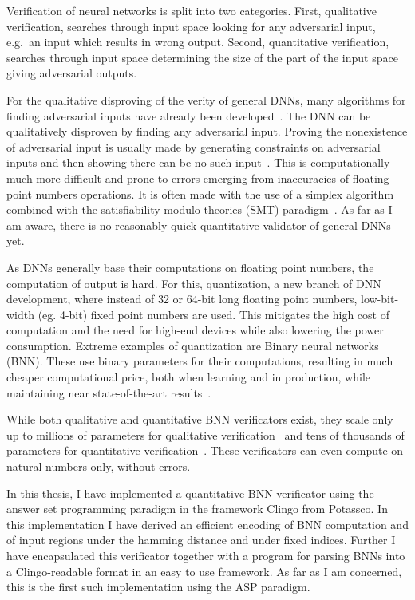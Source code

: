 \documentclass[
    digital,
    color,
    oneside,
    sansbold,
    lot,
    nolof
]{fithesis}
\begin{document}
Verification of neural networks is split into two categories. First,
qualitative verification, searches through input space looking for any
adversarial input, e.g.\ an input which results in wrong output.
Second, quantitative verification, searches through input space
determining the size of the part of the input space giving adversarial outputs.

For the qualitative disproving of the verity of general DNNs,
many algorithms for finding adversarial
inputs have already been developed~\cite{7958570, chen2020real, 8578273}.
The DNN can be qualitatively disproven by finding any adversarial input.
Proving the nonexistence of adversarial input is usually made by generating constraints
on adversarial inputs and then showing there can be no such
input~\cite{Isac2022NeuralNV}. This is computationally much more difficult
and prone to errors emerging from inaccuracies of floating point numbers operations.
It is often made with the use of a simplex algorithm combined with 
the satisfiability modulo theories (SMT) paradigm~\cite{Isac2022NeuralNV, marabou2019, reluplex2017}.
As far as I am aware, there is no reasonably quick quantitative
validator of general DNNs yet.

As DNNs generally base their computations on floating point numbers,
the computation of output is hard. For this, quantization,
a new branch of DNN development, where instead of 32 or 64-bit long floating
point numbers, low-bit-width (eg. 4-bit) fixed point numbers are used.
This mitigates the high cost of computation and the need for high-end devices
while also lowering the power consumption.
Extreme examples of quantization are Binary neural networks (BNN).
These use binary parameters for their computations, resulting in much
cheaper computational price, both when learning and in production,
while maintaining near state-of-the-art results~\cite{Agrawal2023}.

While both qualitative and quantitative BNN verificators exist,
they scale only up to millions of parameters for qualitative verification~\cite{10.1007/978-3-030-03592-1_16}
and tens of thousands of parameters for quantitative verification~\cite{10.1145/3563212}.
These verificators can even compute on natural numbers only, without errors.

In this thesis, I have implemented a quantitative BNN verificator using the
answer set programming paradigm
in the framework Clingo from Potassco. In this implementation I have derived
an efficient encoding of BNN computation and of input regions under the hamming
distance and under fixed indices. Further I have encapsulated this verificator
together with a program for parsing BNNs into a Clingo-readable format
in an easy to use framework.
As far as I am concerned, this is the first such implementation using
the ASP paradigm.
\end{document}
